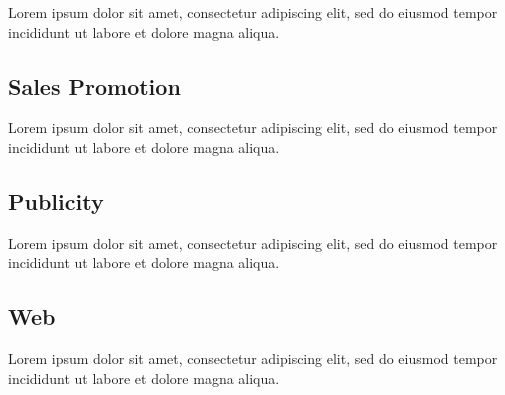 Lorem ipsum dolor sit amet, consectetur adipiscing elit, sed do eiusmod tempor incididunt ut labore et dolore magna aliqua.

\subsection{Sales Promotion}

Lorem ipsum dolor sit amet, consectetur adipiscing elit, sed do eiusmod tempor incididunt ut labore et dolore magna aliqua.

\subsection{Publicity}

Lorem ipsum dolor sit amet, consectetur adipiscing elit, sed do eiusmod tempor incididunt ut labore et dolore magna aliqua.

\subsection{Web}

Lorem ipsum dolor sit amet, consectetur adipiscing elit, sed do eiusmod tempor incididunt ut labore et dolore magna aliqua.
